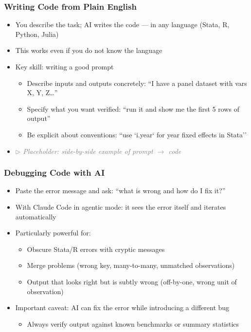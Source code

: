 \documentclass[aspectratio=169, 12pt]{beamer}
\begin{document}
\begin{frame}
\frametitle{Writing Code from Plain English}

\begin{itemize}
    \item You describe the task; AI writes the code --- in any language (Stata, R, Python, Julia)
    \item This works even if you do not know the language
    \item Key skill: writing a good prompt
        \begin{itemize}
            \item[$\circ$] Describe inputs and outputs concretely: ``I have a panel dataset with vars X, Y, Z\ldots''
            \item[$\circ$] Specify what you want verified: ``run it and show me the first 5 rows of output''
            \item[$\circ$] Be explicit about conventions: ``use `i.year` for year fixed effects in Stata''
        \end{itemize}
    \item \textcolor{gray}{\textit{$\triangleright$ Placeholder: side-by-side example of prompt $\to$ code}}
\end{itemize}

\end{frame}


\begin{frame}
\frametitle{Debugging Code with AI}

\begin{itemize}
    \item Paste the error message and ask: ``what is wrong and how do I fix it?''
    \item With Claude Code in agentic mode: it sees the error itself and iterates automatically
    \item Particularly powerful for:
        \begin{itemize}
            \item[$\circ$] Obscure Stata/R errors with cryptic messages
            \item[$\circ$] Merge problems (wrong key, many-to-many, unmatched observations)
            \item[$\circ$] Output that looks right but is subtly wrong (off-by-one, wrong unit of observation)
        \end{itemize}
    \vspace{.05in}
    \item Important caveat: AI can fix the error while introducing a different bug
        \begin{itemize}
            \item[$\circ$] Always verify output against known benchmarks or summary statistics
        \end{itemize}
\end{itemize}

\end{frame}
\end{document}
